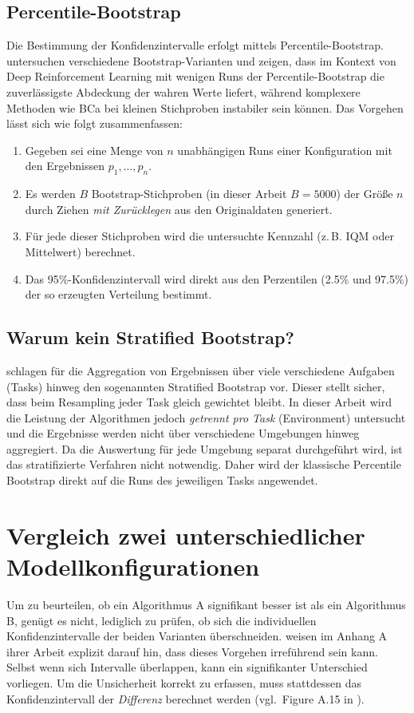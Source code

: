 \subsection*{Percentile-Bootstrap}
Die Bestimmung der Konfidenzintervalle erfolgt mittels Percentile-Bootstrap. \citet{statistical_rl_evaluation} untersuchen verschiedene Bootstrap-Varianten und zeigen, dass im Kontext von Deep Reinforcement Learning mit wenigen Runs der Percentile-Bootstrap die zuverlässigste Abdeckung der wahren Werte liefert, während komplexere Methoden wie BCa bei kleinen Stichproben instabiler sein können. Das Vorgehen lässt sich wie folgt zusammenfassen:
\begin{enumerate}
	\item Gegeben sei eine Menge von \(n\) unabhängigen Runs einer Konfiguration mit den Ergebnissen \(p_1,\dots,p_n\).
	\item Es werden \(B\) Bootstrap-Stichproben (in dieser Arbeit \(B=5000\)) der Größe \(n\) durch Ziehen \emph{mit Zurücklegen} aus den Originaldaten generiert.
	\item Für jede dieser Stichproben wird die untersuchte Kennzahl (z.\,B. \ac{IQM} oder Mittelwert) berechnet.
	\item Das 95\%-Konfidenzintervall wird direkt aus den Perzentilen (2.5\% und 97.5\%) der so erzeugten Verteilung bestimmt.
\end{enumerate}

\subsection*{Warum kein Stratified Bootstrap?}
\citet{statistical_rl_evaluation} schlagen für die Aggregation von Ergebnissen über viele verschiedene Aufgaben (Tasks) hinweg den sogenannten Stratified Bootstrap vor. Dieser stellt sicher, dass beim Resampling jeder Task gleich gewichtet bleibt. In dieser Arbeit wird die Leistung der Algorithmen jedoch \emph{getrennt pro Task} (Environment) untersucht und die Ergebnisse werden nicht über verschiedene Umgebungen hinweg aggregiert. Da die Auswertung für jede Umgebung separat durchgeführt wird, ist das stratifizierte Verfahren nicht notwendig. Daher wird der klassische Percentile Bootstrap direkt auf die Runs des jeweiligen Tasks angewendet.

\section{Vergleich zwei unterschiedlicher Modellkonfigurationen}
Um zu beurteilen, ob ein Algorithmus A signifikant besser ist als ein Algorithmus B, genügt es nicht, lediglich zu prüfen, ob sich die individuellen Konfidenzintervalle der beiden Varianten überschneiden. \citet{statistical_rl_evaluation} weisen im Anhang A ihrer Arbeit explizit darauf hin, dass dieses Vorgehen irreführend sein kann. Selbst wenn sich Intervalle überlappen, kann ein signifikanter Unterschied vorliegen. Um die Unsicherheit korrekt zu erfassen, muss stattdessen das Konfidenzintervall der \emph{Differenz} berechnet werden (vgl.~Figure A.15 in \citet{statistical_rl_evaluation}).
\medskip

